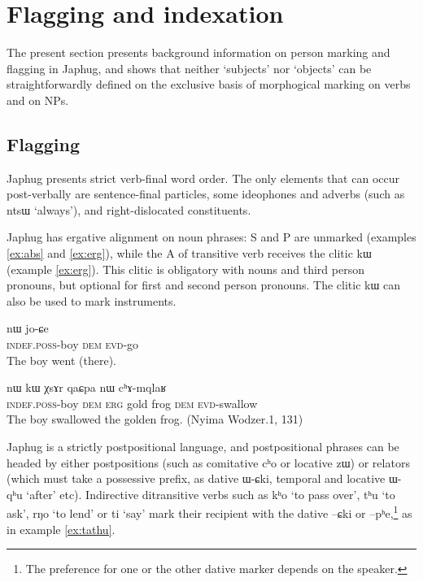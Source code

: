 \documentclass[oldfontcommands,oneside,a4paper,11pt]{article}
\newcommand{\ipa}[1]{{\phon #1}} %
\begin{document}
\section{Flagging and indexation} \label{sec:flagging.indexation}
The present section presents background information on person marking and flagging in Japhug, and shows that neither `subjects' nor `objects' can be straightforwardly defined on the exclusive basis of morphogical marking on 
 verbs and on NPs.


\subsection{Flagging}
Japhug presents strict verb-final word order. The only elements that can occur post-verbally are sentence-final particles, some ideophones and adverbs (such as \ipa{ntsɯ} `always'), and right-dislocated constituents.

Japhug has ergative alignment on noun phrases:  S and P are unmarked (examples \ref{ex:abs} and \ref{ex:erg}), while the A of transitive verb receives the clitic \ipa{kɯ} (example \ref{ex:erg}). This clitic is obligatory with nouns and third person pronouns, but optional for first and second person pronouns. The clitic \ipa{kɯ} can also be used to mark instruments.

\begin{exe}
\ex \label{ex:abs}
\gll \ipa{tɤ-tɕɯ}  	\ipa{nɯ}  	 	\ipa{jo-ɕe}   \\
\textsc{indef.poss}-boy \textsc{dem}   \textsc{evd}-go \\
\glt The boy went (there).
\end{exe}

\begin{exe}
\ex \label{ex:erg}
\gll \ipa{tɤ-tɕɯ}  	\ipa{nɯ}  	\ipa{kɯ}  	\ipa{χsɤr}  	\ipa{qaɕpa}  	\ipa{nɯ}  	\ipa{cʰɤ-mqlaʁ}   \\
\textsc{indef.poss}-boy \textsc{dem} \textsc{erg} gold frog \textsc{dem} \textsc{evd}-swallow \\
\glt The boy swallowed the golden frog. (Nyima Wodzer.1, 131)
\end{exe}


Japhug is a strictly postpositional language, and postpositional phrases can be headed by either postpositions (such as comitative \ipa{cʰo} or locative \ipa{zɯ}) or relators (which must take a possessive prefix, as dative \ipa{ɯ-ɕki}, temporal and locative  \ipa{ɯ-qʰu} `after' etc). Indirective ditransitive verbs such as \ipa{kʰo} `to pass over', \ipa{tʰu} `to ask', \ipa{rŋo} `to lend' or \ipa{ti} `say' mark their recipient with the dative \ipa{--ɕki} or \ipa{--pʰe},\footnote{The preference for one or the other dative marker depends on the speaker.} as in example \ref{ex:tathu}. 
\end{document}
